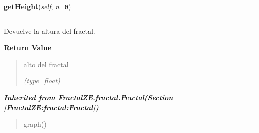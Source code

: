     \vspace{0.5ex}

\hspace{.8\funcindent}\begin{boxedminipage}{\funcwidth}

    \raggedright \textbf{getHeight}(\textit{self}, \textit{n}={\tt 0})

    \vspace{-1.5ex}

    \rule{\textwidth}{0.5\fboxrule}
\setlength{\parskip}{2ex}
    Devuelve la altura del fractal.

\setlength{\parskip}{1ex}
      \textbf{Return Value}
    \vspace{-1ex}

      \begin{quote}
      alto del fractal

      {\it (type=float)}

      \end{quote}

    \end{boxedminipage}


\large{\textbf{\textit{Inherited from FractalZE.fractal.Fractal\textit{(Section \ref{FractalZE:fractal:Fractal})}}}}

\begin{quote}
graph()
\end{quote}
